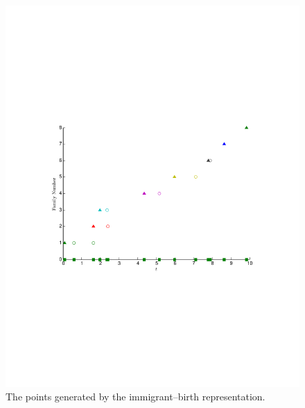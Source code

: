 \begin{figure}[H]
	\centering
	\includegraphics[trim = 0.8cm 8.5cm 0.8cm 8cm,clip,width=1.00\textwidth ]{Hawkess_ClusterFamily.pdf}
	\caption{The points generated by the immigrant–birth representation.}
	\label{Example_ClusterFamily}
\end{figure}

